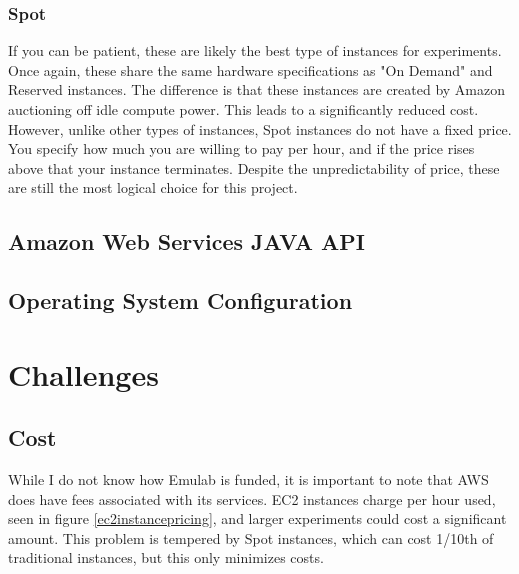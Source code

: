 \documentclass{article}
\begin{document}
\subsubsection{Spot}
If you can be patient, these are likely the best type of instances for experiments. Once again, these share the same hardware specifications as "On Demand" and Reserved instances. The difference is that these instances are created by Amazon auctioning off idle compute power. This leads to a significantly reduced cost.
However, unlike other types of instances, Spot instances do not have a fixed price. You specify how much you are willing to pay per hour, and if the price rises above that your instance terminates. Despite the unpredictability of price, these are still the most logical choice for this project.
\subsection{Amazon Web Services JAVA API}
\subsection{Operating System Configuration}
\section{Challenges}
\subsection{Cost}
While I do not know how Emulab is funded, it is important to note that AWS does have fees associated with its services. EC2 instances charge per hour used, seen in figure \ref{ec2instancepricing}, and larger experiments could cost a significant amount. This problem is tempered by Spot instances, which can cost 1/10th of traditional instances, but this only minimizes costs.
\end{document}
